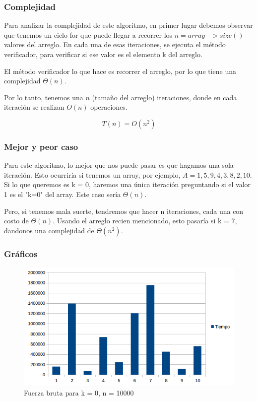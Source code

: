 \subsubsection{Complejidad}
Para analizar la complejidad de este algoritmo, en primer lugar debemos observar que tenemos un ciclo for que puede llegar a recorrer los $n = array->size()$ valores del arreglo. En cada una de esas iteraciones, se ejecuta el método verificador, para verificar si ese valor es el elemento k del arreglo.

El método verificador lo que hace es recorrer el arreglo, por lo que tiene una complejidad $\Theta(n)$.

Por lo tanto, tenemos una $n$ (tamaño del arreglo) iteraciones, donde en cada iteración se realizan $O(n)$ operaciones.

$$ T(n) = O(n^2) $$

\subsubsection{Mejor y peor caso}
Para este algoritmo, lo mejor que nos puede pasar es que hagamos una sola iteración. Esto ocurriría si tenemos un array, por ejemplo, $ A = { 1, 5, 9, 4, 3, 8, 2, 10} $.
Si lo que queremos es k = 0, haremos una única iteración preguntando si el valor 1 es el "k=0" del array. Este caso sería $\Theta(n)$.

Pero, si tenemos mala suerte, tendremos que hacer n iteraciones, cada una con costo de $\Theta(n)$.
Usando el arreglo recien mencionado, esto pasaría si k = 7, dandonos una complejidad de $\Theta(n^2)$.

\subsubsection{Gráficos}
\begin{figure}[H]
\centering
\includegraphics[width=\textwidth]{KZero/BruteForceK0.png}
\caption{Fuerza bruta para k = 0, n = 10000}
\end{figure}

